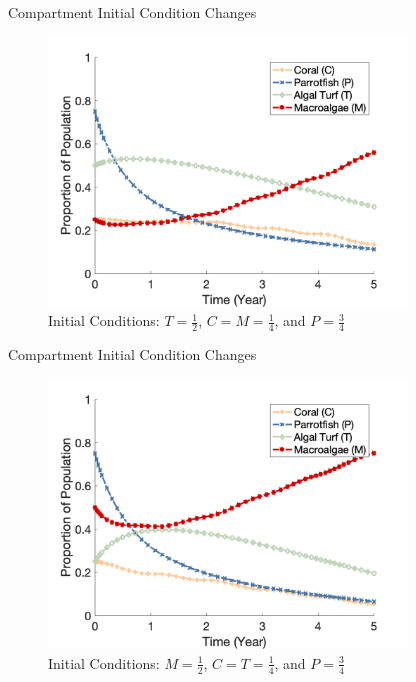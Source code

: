 \documentclass{beamer}
\begin{document}
\begin{frame}{Compartment Initial Condition Changes}
    \begin{figure}
        \centering
        \includegraphics[width=0.85\textwidth]{Latex/Figures/0.25C_0.5T_0.25M.png}
        \caption{Initial Conditions: $T = \frac{1}{2}$, $C = M = \frac{1}{4}$, and $P = \frac{3}{4}$}
        \label{fig:turf_dominant}
    \end{figure}
\end{frame}

\begin{frame}{Compartment Initial Condition Changes}
    \begin{figure}
        \centering
        \includegraphics[width=0.85\textwidth]{Latex/Figures/0.25C_0.25T_0.5M.png}
        \caption{Initial Conditions: $M = \frac{1}{2}$, $C = T = \frac{1}{4}$, and $P = \frac{3}{4}$}
        \label{fig:macroalgae_dominant}
    \end{figure}
\end{frame}
\end{document}
